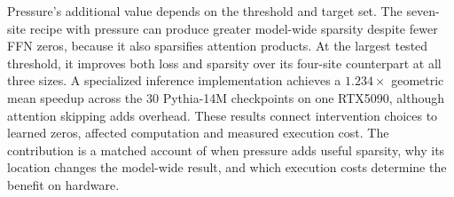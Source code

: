 Pressure's additional value depends on the threshold and target set. The
seven-site recipe with pressure can produce greater model-wide sparsity despite fewer FFN
zeros, because it also sparsifies attention products. At the largest tested
threshold, it improves both loss and sparsity over its four-site counterpart
at all three sizes. A specialized inference implementation achieves a
$1.234\times$ geometric mean speedup across the 30 Pythia-14M checkpoints
on one RTX5090, although attention skipping adds overhead. These results
connect intervention choices to learned zeros, affected computation and
measured execution cost. The contribution is a matched account of when
pressure adds useful sparsity, why its location changes the model-wide result,
and which execution costs determine the benefit on hardware.
